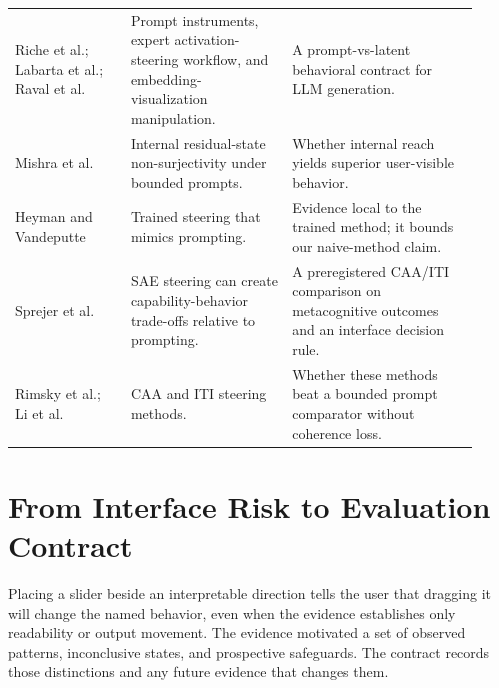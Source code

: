 \documentclass[sigconf]{acmart}
\begin{document}
\begin{table}[t]
\begin{tabular}{L{0.23\linewidth}L{0.32\linewidth}L{0.37\linewidth}}
    Riche et al.; Labarta et al.; Raval et al. \cite{riche2025aiinstr,labarta2026attribution,raval2026latman} & Prompt instruments, expert activation-steering workflow, and embedding-visualization manipulation. & A prompt-vs-latent behavioral contract for LLM generation. \\
    Mishra et al. \cite{mishra2026nonsurj} & Internal residual-state non-surjectivity under bounded prompts. & Whether internal reach yields superior user-visible behavior. \\
    Heyman and Vandeputte \cite{heyman2026steer} & Trained steering that mimics prompting. & Evidence local to the trained method; it bounds our naive-method claim. \\
    Sprejer et al. \cite{sprejer2026mindgap} & SAE steering can create capability-behavior trade-offs relative to prompting. & A preregistered CAA/ITI comparison on metacognitive outcomes and an interface decision rule. \\
    Rimsky et al.; Li et al. \cite{rimsky2024caa,li2023iti} & CAA and ITI steering methods. & Whether these methods beat a bounded prompt comparator without coherence loss. \\
    \bottomrule
  \end{tabular}
\end{table}

\section{From Interface Risk to Evaluation Contract}
\label{sec:contract-derivation}

Placing a slider beside an interpretable direction tells the user that dragging it will change the named behavior, even when the evidence establishes only readability or output movement. The evidence motivated a set of observed patterns, inconclusive states, and prospective safeguards. The contract records those distinctions and any future evidence that changes them.
\end{document}
